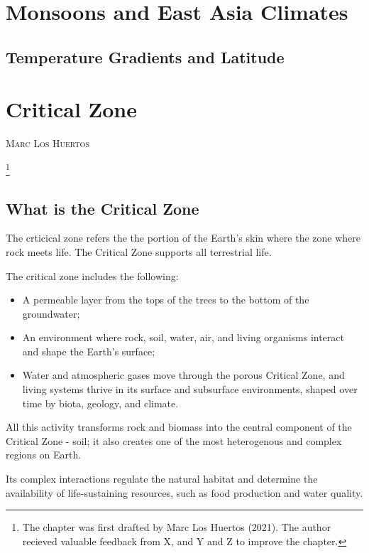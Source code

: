 \documentclass{book}\usepackage{knitr}
\makeatletter
\newcommand{\chapterauthor}[1]{%
  {\parindent0pt\vspace*{-25pt}%
  \linespread{1.1}\large\scshape#1%
  \par\nobreak\vspace*{35pt}}
  \@afterheading%
}
\makeatother
\begin{document}
\chapter{Monsoons and East Asia Climates}

\section{Temperature Gradients and Latitude}





\chapter{Critical Zone}\label{ch:critical-zone}

\chapterauthor{Marc Los Huertos}\footnote{The chapter was first drafted by Marc Los Huertos (2021). The author recieved valuable feedback from X, and Y and Z to improve the chapter.}

\section{What is the Critical Zone}

The crticical zone refers the the portion of the Earth's skin where the zone where rock meets life. The Critical Zone supports all terrestrial life.

The critical zone includes the following:

\begin{itemize}
  \item A permeable layer from the tops of the trees to the bottom of the groundwater;
  \item An environment where rock, soil, water, air, and living organisms interact and shape the Earth's surface;
  \item Water and atmospheric gases move through the porous Critical Zone, and living systems thrive in its surface and subsurface environments, shaped over time by biota, geology, and climate.
\end{itemize}

All this activity transforms rock and biomass into the central component of the Critical Zone - soil; it also creates one of the most heterogenous and complex regions on Earth.

Its complex interactions regulate the natural habitat and determine the availability of life-sustaining resources, such as food production and water quality.
\end{document}

